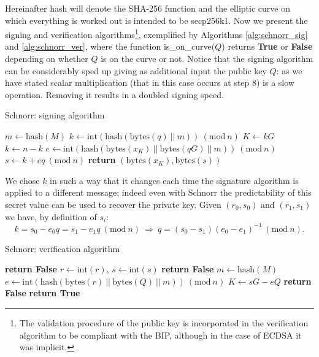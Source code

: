 \bigskip
\noindent
Hereinafter hash will denote the SHA-256 function and the elliptic curve on which everything is worked out is intended to be secp256k1. Now we present the signing and verification algorithms\footnote{The validation procedure of the public key is incorporated in the verification algorithm to be compliant with the BIP, although in the case of ECDSA it was implicit.}, exemplified by Algorithms \ref{alg:schnorr_sig} and \ref{alg:schnorr_ver}, where the function is\_on\_curve($Q$) returns \textbf{True} or \textbf{False} depending on whether $Q$ is on the curve or not. Notice that the signing algorithm can be considerably sped up giving as additional input the public key $Q$: as we have stated scalar multiplication (that in this case occurs at step 8) is a slow operation. Removing it results in a doubled signing speed.

\bigskip

\begin{algorithm}
	\caption{Schnorr: signing algorithm}
	\label{alg:schnorr_sig}
	\begin{algorithmic}[1]
		\State $m \gets \text{hash}(M)$
		\State $k \gets \text{int}(\text{hash}(\text{bytes}(q) \ || \ m)) \ (\text{mod} \ n)$
		\State $K \gets kG$
		\State $k \gets n - k$
		\EndIf
		\State $e \gets \text{int}(\text{hash}(\text{bytes}(x_K) \ || \ \text{bytes}(qG) \ || \ m)) \ (\text{mod} \ n)$
		\State $s \gets k + eq \ (\text{mod} \ n)$
		\State \textbf{return} $(\text{bytes}(x_K), \text{bytes}(s))$
		\EndProcedure
	\end{algorithmic}
\end{algorithm}

\noindent
We chose $k$ in such a way that it changes each time the signature algorithm is applied to a different message; indeed even with Schnorr the predictability of this secret value can be used to recover the private key. Given $(r_0, s_0)$ and $(r_1, s_1)$ we have, by definition of $s_i$:
$$k = s_0 - e_0q = s_1 - e_1q\ (\text{mod} \ n) \ \Longrightarrow \ q = (s_0 - s_1)(e_0 - e_1)^{-1} \ (\text{mod} \ n).$$

\bigskip

\begin{algorithm}
	\caption{Schnorr: verification algorithm}
	\label{alg:schnorr_ver}
	\begin{algorithmic}[1]
		\State \textbf{return False}
		\EndIf 
		\State $r \gets \text{int}(r)$, $s \gets \text{int}(s)$
		\State \textbf{return False}
		\EndIf
		\State $m \gets \text{hash}(M)$
		\State $e \gets \text{int}(\text{hash}(\text{bytes}(r) \ || \ \text{bytes}(Q) \ || \ m)) \ (\text{mod} \ n)$
		\State $K \gets sG - eQ$
		\State \textbf{return False} 
		\EndIf
		\State \textbf{return True}
		\EndProcedure	
	\end{algorithmic}
\end{algorithm}


